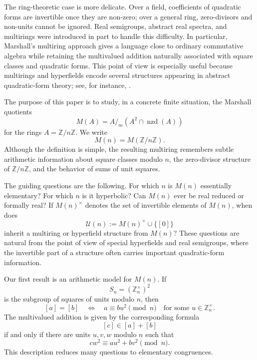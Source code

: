 \documentclass[a4paper,10pt]{article}
\newcommand{\cl}[1]{\left[#1\right]}
\newcommand{\nzd}{\operatorname{nzd}}
\newcommand{\U}{\mathcal U}
\begin{document}
The ring-theoretic case is more delicate.  Over a field, coefficients of quadratic forms are invertible once they are non-zero; over a general ring, zero-divisors and non-units cannot be ignored.  Real semigroups, abstract real spectra, and multirings were introduced in part to handle this difficulty.  In particular, Marshall's multiring approach \cite{marshall2006real} gives a language close to ordinary commutative algebra while retaining the multivalued addition naturally associated with square classes and quadratic forms.  This point of view is especially useful because multirings and hyperfields encode several structures appearing in abstract quadratic-form theory; see, for instance, \cite{ribeiro2016functorial,roberto2021quadratic,roberto2021ktheory}.

The purpose of this paper is to study, in a concrete finite situation, the Marshall quotients
\[
        M(A)=A/_m(A^2\cap\nzd(A))
\]
for the rings $A=\mathbb Z/n\mathbb Z$.  We write
\[
        M(n)=M(\mathbb Z/n\mathbb Z).
\]
Although the definition is simple, the resulting multiring remembers subtle arithmetic information about square classes modulo $n$, the zero-divisor structure of $\mathbb Z/n\mathbb Z$, and the behavior of sums of unit squares.

The guiding questions are the following.  For which $n$ is $M(n)$ essentially elementary?  For which $n$ is it hyperbolic?  Can $M(n)$ ever be real reduced or formally real?  If $M(n)^\times$ denotes the set of invertible elements of $M(n)$, when does
\[
        \U(n):=M(n)^\times\cup\{\cl0\}
\]
inherit a multiring or hyperfield structure from $M(n)$?  These questions are natural from the point of view of special hyperfields and real semigroups, where the invertible part of a structure often carries important quadratic-form information.

Our first result is an arithmetic model for $M(n)$.  If
\[
        S_n=(\mathbb Z_n^\times)^2
\]
is the subgroup of squares of units modulo $n$, then
\[
        \cl a=\cl b \quad\Longleftrightarrow\quad
        a\equiv bu^2\pmod n
        \quad\mbox{for some }u\in\mathbb Z_n^\times.
\]
The multivalued addition is given by the corresponding formula
\[
        \cl c\in \cl a+\cl b
\]
if and only if there are units $u,v,w$ modulo $n$ such that
\[
        cw^2\equiv au^2+bv^2\pmod n.
\]
This description reduces many questions to elementary congruences.
\end{document}
